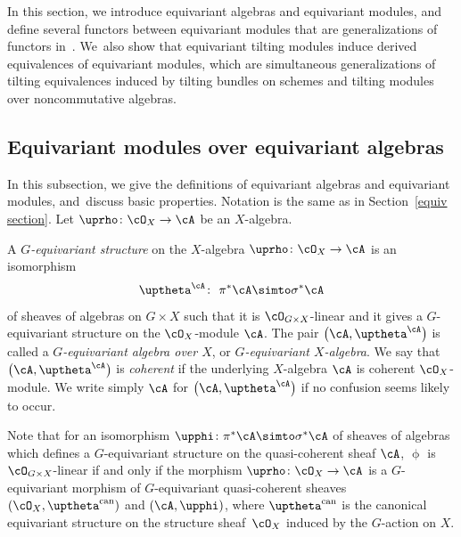 In this section, we introduce equivariant algebras and equivariant modules, and define seve\-ral functors between equivariant modules that are generalizations of functors in~\cite[Section~2]{bfk}. We~also show that equivariant tilting modules induce derived equivalences of equivariant modules, which are simultaneous generalizations of tilting equivalences induced by tilting bundles on schemes and tilting modules over noncommutative algebras.

\subsection{Equivariant modules over equivariant algebras}

In this subsection, we give the definitions of equivariant algebras and equivariant modules, and~dis\-cuss basic properties.
Notation is the same as in Section~\ref{equiv section}. Let $\uprho\colon \cO_X\to \cA$ be an $X$-algebra.

\begin{dfn}
A {\it $G$-equivariant structure} on the $X$-algebra $\uprho\colon \cO_X\to\cA$ is an isomorphism
\begin{gather*}
\uptheta^{\cA}\colon\ \pi^*\cA\simto \sigma^*\cA
\end{gather*}
 of sheaves of algebras on $G\times X$
such that it is $\cO_{G\times X}$-linear and it gives a $G$-equivariant structure on the $\cO_X$-module $\cA$. The pair $\big(\cA,\uptheta^{\cA}\big)$ is called a {\it $G$-equivariant algebra over $X$}, or {\it $G$-equivariant $X$-algebra}. We say that $\big(\cA,\uptheta^{\cA}\big)$ is {\it coherent} if the underlying $X$-algebra $\cA$ is coherent $\cO_X$-module. We write simply $\cA$ for $\big(\cA,\uptheta^{\cA}\big)$ if no confusion seems likely to occur.
\end{dfn}

\begin{rem}\label{linearity}
Note that for an isomorphism $\upphi \colon \pi^*\cA\simto \sigma^*\cA$ of sheaves of algebras which defines a $G$-equivariant structure on the quasi-coherent sheaf $\cA$, $\upphi$ is $\cO_{G\times X}$-linear if and only if the morphism $\uprho\colon \cO_X\to \cA$ is a $G$-equivariant morphism of $G$-equivariant quasi-coherent sheaves $(\cO_X,\uptheta^{\rm can})$ and $(\cA,\upphi)$, where $\uptheta^{\rm can}$ is the canonical equivariant structure on the structure sheaf~$\cO_X$ induced by the $G$-action on $X$.
\end{rem}

